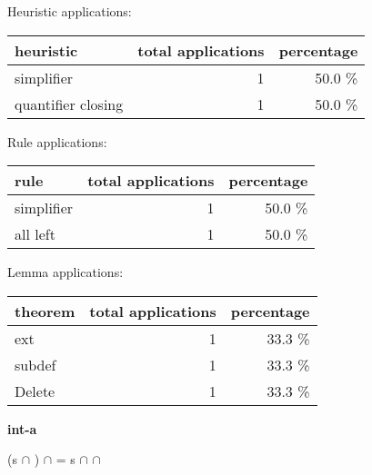 \documentclass[a4paper]{article}
\begin{document}
\medskip


Heuristic applications:

\begin{supertabular}{l|r|r}
heuristic	& total applications & percentage \\ \hline
simplifier & 1 & 50.0 \% \\
quantifier closing & 1 & 50.0 \% \\

\end{supertabular}

Rule applications:

\begin{supertabular}{l|r|r}
rule	        & total applications & percentage \\ \hline
simplifier & 1 & 50.0 \% \\
all left & 1 & 50.0 \% \\

\end{supertabular}

Lemma applications:

\begin{supertabular}{l|r|r}
theorem	        & total applications & percentage \\ \hline
ext & 1 & 33.3 \% \\
subdef & 1 & 33.3 \% \\
Delete & 1 & 33.3 \% \\

\end{supertabular}
\pagebreak

{\LARGE\bf int-a}\label{lemma-int-a}

\medskip

 \Fol (s $\cap$ ) $\cap$  = s $\cap$  $\cap$ 
\end{document}
